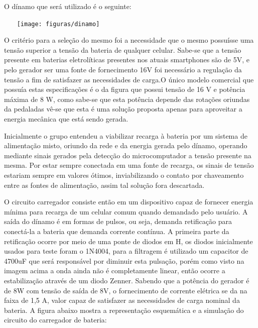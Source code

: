 O dínamo que será utilizado é o seguinte:

\begin{center}
    \texttt{[image: figuras/dinamo]}
       \label{dinamo}
   \end{center}

O critério para a seleção do mesmo foi a necessidade que o mesmo possuísse uma tensão superior a tensão da bateria de qualquer celular. Sabe-se que a tensão presente em baterias eletrolíticas presentes nos atuais smartphones são de 5V, e pelo gerador ser uma fonte de fornecimento 16V foi necessário a regulação da tensão a fim de satisfazer as necessidades de carga.O único modelo comercial que possuía estas especificações é o da figura que possui tensão de 16 V e potência máxima de 8 W, como sabe-se que esta potência depende das rotações oriundas da pedaladas vê-se que esta é uma solução proposta apenas para aproveitar a energia mecânica que está sendo gerada. 

Inicialmente o grupo entendeu a viabilizar recarga à bateria por um sistema de alimentação misto, oriundo da rede e da energia gerada pelo dínamo, operando mediante sinais gerados pela detecção do microcomputador a tensão presente na mesma. Por estar sempre conectada em uma fonte de recarga, os sinais de tensão estariam sempre em valores ótimos, inviabilizando o contato por chaveamento entre as fontes de alimentação, assim tal solução fora descartada.   

O circuito carregador consiste então em um dispositivo capaz de fornecer energia mínima para recarga de um celular comum quando demandado pelo usuário. A saída do dínamo é em formas de pulsos, ou seja, demanda retificação para conectá-la a bateria que demanda corrente contínua. A primeira parte da retificação ocorre por meio de uma ponte de diodos em H, os diodos inicialmente usados para teste foram o 1N4004, para a filtragem é utilizado um capacitor de 4700uF que será responsável por diminuir esta pulsação, porém como visto na imagem acima a onda ainda não é completamente linear, então ocorre a estabilização através de um diodo Zenner. Sabendo que a potência do gerador é de 8W com tensão de saída de 8V, o fornecimento de corrente elétrica se da na faixa de 1,5 A, valor capaz de satisfazer as necessidades de carga nominal da bateria. A figura abaixo mostra a representação esquemática e a simulação do circuito do carregador de bateria:

